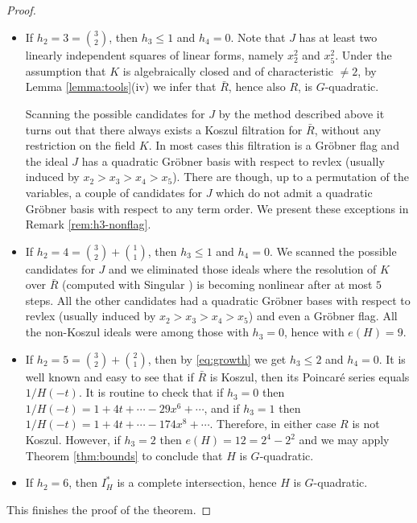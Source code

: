 \documentclass[12pt]{amsart}
\begin{document}
\begin{proof}
\begin{itemize}
Testing with Singular (\cite{Sing}) the possible candidates for $J$,  it is easy to check that all of them have a quadratic Gr\"obner 
basis with respect to revlex (usually induced by $x_2>x_3>x_4>x_5$). 
All of them possess  a Koszul filtration and in all but one situation presented in Remark \ref{rem:h2-nonflag} there exists a 
Gr\"obner flag with basis $\{x_2, x_3,x_4, x_5\}$.

\item	
If $h_2=3= \binom{3}{2}$, then $h_3 \leq 1$ and $h_4=0$.	Note that $J$ has at least two linearly independent squares of linear forms, namely $x_2^2$ and $x_5^2$.
Under the assumption that $K$ is algebraically closed and of characteristic $\neq 2$, by Lemma \ref{lemma:tools}(iv) 
we infer that $\bar{R}$, hence also $R$, is $G$-quadratic.

Scanning the possible candidates for $J$ by the method described above it turns out that there always exists a Koszul filtration for $\bar{R}$, without any restriction on the field $K$. 
In most cases this filtration is a Gr\"obner flag and the ideal $J$ has a quadratic Gr\"obner basis with respect to revlex (usually induced by $x_2>x_3>x_4>x_5$).
There are though, up to a permutation of the variables, a couple of candidates for $J$ which do not admit a quadratic Gr\"obner basis with respect to any term order.
We present these exceptions in Remark \ref{rem:h3-nonflag}.
\item
If $h_2=4= \binom{3}{2}+ \binom{1}{1}$, then $h_3 \leq 1$ and $h_4=0$.
We scanned the possible candidates for $J$ and we eliminated those ideals where the resolution of $K$ over $\bar{R}$ (computed with Singular \cite{Sing})   
is becoming nonlinear after at most $5$ steps.
All the other candidates had a quadratic Gr\"obner bases with respect to revlex (usually induced by $x_2>x_3>x_4>x_5$) and even a Gr\"obner flag.
All the non-Koszul ideals were among  those with $h_3=0$, hence with $e(H)=9$.
	
\item	
If $h_2=5= \binom{3}{2}+ \binom{2}{1}$, then by \eqref{eq:growth} we get $h_3\leq 2$ and $h_4=0$.
It is well known and easy to see that if $\bar{R}$ is Koszul, then its Poincar\'e  series equals $1/H(-t)$.
It is routine to check that if $h_3=0$ then $1/H(-t)= 1+4t+\cdots -29x^6+\cdots$, and if $h_3=1$ then $1/H(-t)= 1+4t+\cdots -174 x^8+\cdots$. 
Therefore, in either case ${R}$ is not Koszul.
However, if $h_3=2$ then $e(H)= 12=2^4-2^2$ and we may apply Theorem \ref{thm:bounds} to conclude that $H$ is $G$-quadratic.
\item
If $h_2=6$, then $I_H^*$ is a complete intersection, hence  $H$ is $G$-quadratic.
\end{itemize}
This finishes the proof of the theorem.
\end{proof}
\end{document}
